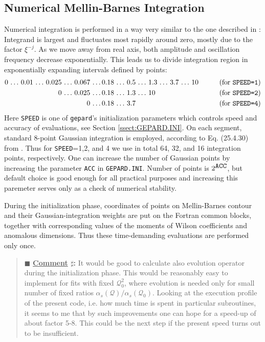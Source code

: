 \documentclass[12pt]{article}
\newcounter{comment}
\newenvironment{commblock}%
{\refstepcounter{comment}%
\begin{quote}\renewcommand{\baselinestretch}{1}
\ttfamily\small$\blacksquare$ \textbf{\underline{Comment} $\sharp$\thecomment:}}%
{\end{quote}}
\begin{document}
\subsection{Numerical Mellin-Barnes Integration}  
\label{ssect:Integration}
Numerical integration is performed in a way very similar to the one described in
\cite{Vogt:2004ns}: Integrand is largest and
fluctuates most rapidly around zero, mostly due to the factor $\xi^{-j}$. As we
move away from real axis, both
amplitude and oscillation frequency decrease exponentially.
This leads us to divide integration region in exponentially expanding intervals
defined by points:
\begin{align*}
0 \,\ldots\, 0.01 \,\ldots\, 0.025\,\ldots\, 0.067\,\ldots\,& 0.18\,\ldots\, 0.5\,\ldots\, 1.3\,\ldots\, 3.7\,\ldots\, 10&
\qquad \text{(for \texttt{SPEED=1})} \\
0  \,\ldots\, 0.025\,\ldots\,& 0.18\,\ldots\, 1.3 \,\ldots\, 10&
\qquad \text{(for \texttt{SPEED=2})} \\
0  \,\ldots\,& 0.18 \,\ldots\, 3.7&
\qquad \text{(for \texttt{SPEED=4})} \\
\label{<intervals>}
\end{align*}
Here \texttt{SPEED} is one of \texttt{gepard}'s initialization parameters which
controls speed and accuracy of evaluations, see Section \ref{ssect:GEPARD.INI}.
On each segment, standard 8-point Gaussian integration is employed, according
to Eq. (25.4.30) from \cite{AbS65}.
Thus for \texttt{SPEED}=1,2, and 4 we use in total 64, 32, and 16
integration points, respectively. 
One can increase the number of Gaussian points by increasing the parameter
\texttt{ACC} in \texttt{GEPARD.INI}. Number of points is $2^{\mbox{\texttt{ACC}}}$,
but default choice is good enough for all practical purposes and increasing this
paremeter serves only as a check of numerical stability.

During the initialization phase, coordinates of points on Mellin-Barnes contour and 
their Gaussian-integration weights
are put on the Fortran common blocks, together with corresponding values of
the moments of Wilson coefficients and anomalous dimensions. Thus these
time-demanding evaluations are performed only once.

\begin{commblock}
It would be good to calculate also evolution operator during the initialization phase.
This would be reasonably easy to implement for fits with fixed $\mathcal{Q}_{0}^2$, 
where evolution is needed only for small number of fixed ratios 
$\alpha_{s}(\mathcal{Q})/\alpha_{s}(\mathcal{Q}_0)$. 
Looking at the execution profile of the present code, i.e. how much time is spent
in particular subroutines, it seems to me that by such improvements one can hope
for a speed-up of about factor 5-8. This could be the next step if the present
speed turns out to be insufficient.
\end{commblock}
\end{document}
